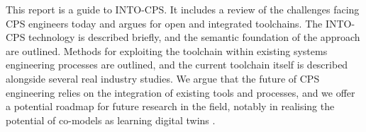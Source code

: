\documentclass[a4paper,12pt,final]{include/intocpsassociation}   %
\newenvironment{assumption}{\noindent\smallskip\color{blue}\begin{framed}\begin{minipage}{0.95\columnwidth}}{\end{minipage}\end{framed}\smallskip\par}
\newif\ifcomments
\newcommand{\claudio}[1]{%
\ifcomments %
{\bfseries \scriptsize \color{red} Claudio: #1} %
\else %
\fi%
}%
\begin{document}
This report is a guide to INTO-CPS. It includes a review of the challenges facing CPS engineers today and argues for open and integrated toolchains. The INTO-CPS technology is described briefly, and the semantic foundation of the approach are \claudio{``is'', instead of ``are''?} outlined. Methods for exploiting the toolchain within existing systems engineering processes are outlined, and the current toolchain itself is described alongside several real \claudio{I would remove ``real'' from here. It seems we're trying too hard to show that they are real\ldots} industry studies. We argue that the future of CPS engineering relies on the integration of existing tools and processes, and we offer a potential roadmap for future research in the field, notably in realising the potential of co-models as learning digital twins \claudio{It's not clear what ``learning digital twins'' here means\ldots is it AI enhance digital twins?}.
\newpage
%
\tableofcontents
\newpage
%
%
%
%
%
%

\clearpage

\clearpage

\clearpage

\clearpage

\clearpage

\clearpage

\clearpage

\clearpage

\clearpage
%
%
%
%


\label{ch:bib} %
%
%
%
\clearpage
%
%
%
\appendix

\clearpage

\clearpage

%
%
%
\end{document}
